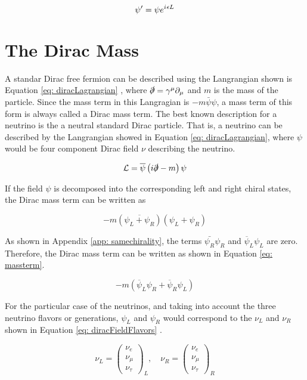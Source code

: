 \begin{equation}\label{eq: Ltransformation}
\psi^{\prime} = \psi e^{{i\mkern1mu} \epsilon L} 
\end{equation}

\section{The Dirac Mass}

A standar Dirac free fermion can be described using the Langrangian shown is Equation \ref{eq: diracLagrangian} \cite{NeutrinoMass}, where $\slashed{\partial} = \gamma^{\mu}\partial_{\mu}$ and $m$ is the mass of the particle. Since the mass term in this Langragian is $-m\bar{\psi}\psi$, a mass term of this form is always called a Dirac mass term. The best known description for a neutrino is the a neutral standard Dirac particle. That is, a neutrino can be described by the Langrangian showed in Equation \ref{eq: diracLagrangian}, where $\psi$ would be four component Dirac field $\nu$ describing the neutrino. 

\begin{equation}\label{eq: diracLagrangian}
 \mathcal{L} = \overline{\psi}\left(i\slashed{\partial} - m\right)\psi
\end{equation} 

If the field $\psi$ is decomposed into the corresponding left and right chiral states, the Dirac mass term can be written as 

$$-m(\overline{\psi_{L} + \psi_{R}})(\psi_{L} + \psi_{R})$$

As shown in Appendix \ref{app: samechirality}, the terms $\bar{\psi_{R}}\psi_{R}$ and $\overline{\psi}_{L}\psi_{L}$ are zero. Therefore, the Dirac mass term can be written as shown in Equation \ref{eq: massterm}. 

\begin{equation} \label{eq: massterm}
-m \left(\overline{\psi}_{L}\psi_{R} + \overline{\psi}_{R}\psi_{L}\right)
\end{equation}

For the particular case of the neutrinos, and taking into account the three neutrino flavors or generations, $\psi_{L}$ and $\psi_{R}$ would correspond to the $\nu_{L}$ and $\nu_{R}$ shown in Equation \ref{eq: diracFieldFlavors} \cite{NeutrinoMass}.

\begin{equation}\label{eq: diracFieldFlavors}
\nu_{L} = \begin{pmatrix} \nu_{e}\\ \nu_{\mu} \\ \nu_{\tau} \end{pmatrix}_{L} , \quad \nu_{R} = \begin{pmatrix} \nu_{e}\\ \nu_{\mu} \\ \nu_{\tau} \end{pmatrix}_{R}
\end{equation}

